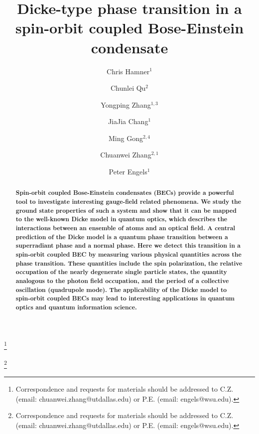 \documentclass[prl,aps,twocolumn,floatfix]{revtex4}
\begin{document}
\title{Dicke-type phase transition in a spin-orbit coupled Bose-Einstein
condensate}
\author{Chris Hamner$^{1}$}
\author{Chunlei Qu$^{2}$}
\author{Yongping Zhang$^{1,3}$}
\author{JiaJia Chang$^{1}$}
\author{Ming Gong$^{2,4}$}
\author{Chuanwei Zhang$^{2,1}$}
\thanks{Correspondence and requests for materials should be addressed to C.Z. (email: chuanwei.zhang@utdallas.edu) or P.E. (email: engels@wsu.edu).}
\author{Peter Engels$^{1}$}
\thanks{Correspondence and requests for materials should be addressed to C.Z. (email: chuanwei.zhang@utdallas.edu) or P.E. (email: engels@wsu.edu).}

\begin{abstract}
\textbf{Spin-orbit coupled Bose-Einstein condensates (BECs) provide a
powerful tool to investigate interesting gauge-field related phenomena. We
study the ground state properties of such a system and show that it can be
mapped to the well-known Dicke model in quantum optics, which describes the
interactions between an ensemble of atoms and an optical field. A central
prediction of the Dicke model is a quantum phase transition between a
superradiant phase and a normal phase. Here we detect this transition in a
spin-orbit coupled BEC by measuring various physical quantities across the
phase transition. These quantities include the spin polarization, the
relative occupation of the nearly degenerate single particle states, the
quantity analogous to the photon field occupation, and the period of a
collective oscillation (quadrupole mode). The applicability of the Dicke
model to spin-orbit coupled BECs may lead to interesting applications in
quantum optics and quantum information science. }
\end{abstract}

\maketitle
\end{document}
